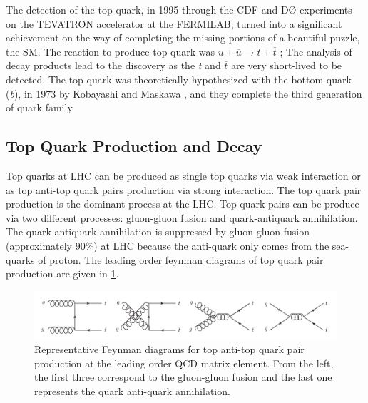 The detection of the top quark, in 1995 through the CDF \cite{PhysRevLett.74.2626} and DØ \cite{PhysRevLett.74.2632} experiments on the TEVATRON accelerator at the FERMILAB, turned into a significant achievement on the way of completing the missing portions of a beautiful puzzle, the SM. The reaction to produce top quark was $u+\overline{u} \rightarrow t+\overline{t}$ ; The analysis of decay products lead to the discovery as the \textit{t} and $\overline{t}$ are very short-lived to be detected. The top quark was theoretically hypothesized with the bottom quark (\textit{b}), in 1973 by Kobayashi and Maskawa \cite{10.1143/PTP.49.652}, and they complete the third generation of quark family. 

\subsection{Top Quark Production and Decay}
\label{TopQproductiondecay}

Top quarks at LHC can be produced as single top quarks via weak interaction or as top anti-top quark pairs production via strong interaction. The top quark pair production is the dominant process at the LHC. Top quark pairs can be produce via two different processes: gluon-gluon fusion and quark-antiquark annihilation. The quark-antiquark annihilation is suppressed by gluon-gluon fusion (approximately $90\%$) at LHC because the anti-quark only comes from the sea-quarks of proton. The leading order feynman diagrams of top quark pair production are given in \ref{fig:toppairproduction}.
 
\begin{figure}[H]
\centering
\includegraphics[scale=0.3]{Figures/top_pair_production.png}
\decoRule
\caption{Representative Feynman diagrams for top anti-top quark pair production at the leading order QCD matrix element. From the left, the first three correspond to the gluon-gluon fusion and the last one represents the quark anti-quark annihilation\cite{borathesis1}.}
\label{fig:toppairproduction}
\end{figure} 

